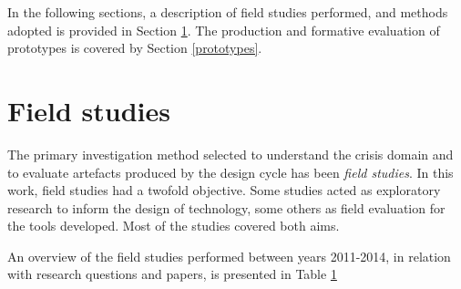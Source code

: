 In the following sections, a description of field studies performed, and
methods adopted is provided in Section \ref{field-studies}. The
production and formative evaluation of prototypes is covered by Section
\ref{prototypes}.

\section{Field studies}\label{field-studies}

The primary investigation method selected to understand the crisis
domain and to evaluate artefacts produced by the design cycle has been
\emph{field studies}. In this work, field studies had a twofold
objective. Some studies acted as exploratory research to inform the
design of technology, some others as field evaluation for the tools
developed. Most of the studies covered both aims.

An overview of the field studies performed between years 2011-2014, in
relation with research questions and papers, is presented
 in Table
\ref{field-studies}

